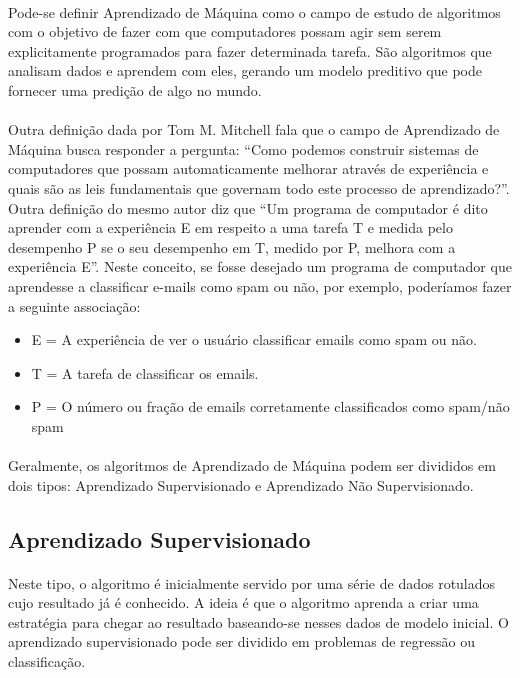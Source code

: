 \documentclass[grad,numbers]{coppe}
\begin{document}
  	\paragraph{}Pode-se definir Aprendizado de Máquina como o campo de estudo de algoritmos com o objetivo de fazer com que computadores possam agir sem serem explicitamente programados para fazer determinada tarefa. São algoritmos que analisam dados e aprendem com eles, gerando um modelo preditivo que pode fornecer uma predição de algo no mundo.
  	\paragraph{}Outra definição dada por Tom M. Mitchell\cite{ml-mitchell} fala que o campo de Aprendizado de Máquina busca responder a pergunta: ``Como podemos construir sistemas de computadores que possam automaticamente melhorar através de experiência e quais são as leis fundamentais que governam todo este processo de aprendizado?''. Outra definição do mesmo autor\cite{ml-mitchell-book} diz que ``Um programa de computador é dito aprender com a experiência E em respeito a uma tarefa T e medida pelo desempenho P se o seu desempenho em T, medido por P, melhora com a experiência E''. Neste conceito, se fosse desejado um programa de computador que aprendesse a classificar e-mails como spam ou não, por exemplo, poderíamos fazer a seguinte associação:
  	\begin{itemize}
  		\item E = A experiência de ver o usuário classificar emails como spam ou não.
			\item T = A tarefa de classificar os emails.
			\item P = O número ou fração de emails corretamente classificados como spam/não spam
  	\end{itemize}
  	\paragraph{}Geralmente, os algoritmos de Aprendizado de Máquina podem ser divididos em dois tipos: Aprendizado Supervisionado e Aprendizado Não Supervisionado.
  	\subsection{Aprendizado Supervisionado}
  		\paragraph{}Neste tipo, o algoritmo é inicialmente servido por uma série de dados rotulados cujo resultado já é conhecido. A ideia é que o algoritmo aprenda a criar uma estratégia para chegar ao resultado baseando-se nesses dados de modelo inicial. O aprendizado supervisionado pode ser dividido em problemas de regressão ou classificação.
\end{document}
